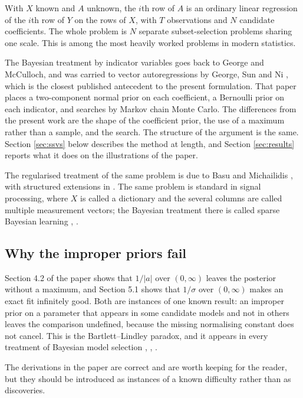 With $X$ known and $A$ unknown, the $i$th row of $A$ is an ordinary linear
regression of the $i$th row of $Y$ on the rows of $X$, with $T$ observations and
$N$ candidate coefficients. The whole problem is $N$ separate subset-selection
problems sharing one scale. This is among the most heavily worked problems in
modern statistics.

The Bayesian treatment by indicator variables goes back to George and McCulloch,
and was carried to vector autoregressions by George, Sun and Ni
\cite{gsn2008}, which is the closest published antecedent to the present
formulation. That paper places a two-component normal prior on each coefficient, a
Bernoulli prior on each indicator, and searches by Markov chain Monte Carlo. The
differences from the present work are the shape of the coefficient prior, the use
of a maximum rather than a sample, and the search. The structure of the argument is
the same. Section \ref{sec:ssvs} below describes the method at length, and
Section \ref{sec:results} reports what it does on the illustrations of the paper.

The regularised treatment of the same problem is due to Basu and Michailidis
\cite{basu2015}, with structured extensions in \cite{nicholson2015}. The same
problem is standard in signal processing, where $X$ is called a dictionary and the
several columns are called multiple measurement vectors; the Bayesian treatment
there is called sparse Bayesian learning \cite{zhang2011}, \cite{ament2021}.

\subsection{Why the improper priors fail}

Section 4.2 of the paper shows that $1 / |a|$ over $(0,\infty)$ leaves the
posterior without a maximum, and Section 5.1 shows that $1 / \sigma$ over
$(0,\infty)$ makes an exact fit infinitely good. Both are instances of one known
result: an improper prior on a parameter that appears in some candidate models and
not in others leaves the comparison undefined, because the missing normalising
constant does not cancel. This is the Bartlett--Lindley paradox, and it appears in
every treatment of Bayesian model selection \cite{llorente2022}, \cite{kass1995},
\cite{mattei2019}.

The derivations in the paper are correct and are worth keeping for the reader, but
they should be introduced as instances of a known difficulty rather than as
discoveries.

